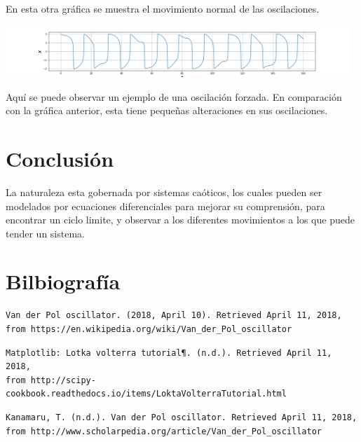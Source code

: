 \documentclass{article}
\begin{document}
En esta otra gráfica se muestra el movimiento normal de las oscilaciones.

\begin{center}
	\includegraphics[width=13cm]{CuartaFig.png}
    
\end{center}
\vspace{0.3cm}

Aquí se puede observar un ejemplo de una oscilación forzada. En comparación con la gráfica anterior, esta tiene pequeñas alteraciones en sus oscilaciones.
 
 
\section{Conclusión}

La naturaleza esta gobernada por sistemas caóticos, los cuales pueden ser modelados por ecuaciones diferenciales para mejorar su comprensión, para encontrar un ciclo limite, y observar a los diferentes movimientos a los que puede tender un sistema.


\section{Bilbiografía}

\begin{verbatim}
Van der Pol oscillator. (2018, April 10). Retrieved April 11, 2018,
from https://en.wikipedia.org/wiki/Van_der_Pol_oscillator 
\end{verbatim}

\begin{verbatim}
Matplotlib: Lotka volterra tutorial¶. (n.d.). Retrieved April 11, 2018, 
from http://scipy-cookbook.readthedocs.io/items/LoktaVolterraTutorial.html 
\end{verbatim}

\begin{verbatim}
Kanamaru, T. (n.d.). Van der Pol oscillator. Retrieved April 11, 2018, 
from http://www.scholarpedia.org/article/Van_der_Pol_oscillator 
\end{verbatim}
\end{document}
